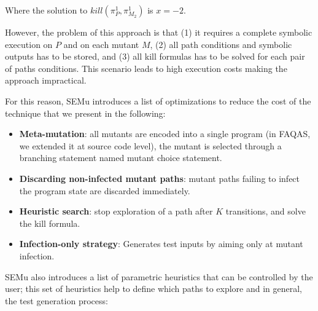Where the solution to $kill(\pi_{P}^{1}, \pi_{M_2}^{1})$ is $x = -2$.

However, the problem of this approach is that (1) it requires a complete symbolic execution on $P$ and on each mutant $M$, (2) all path conditions and symbolic outputs has to be stored, and (3) all kill formulas has to be solved for each pair of paths conditions. This scenario leads to high execution costs making the approach impractical.

For this reason, SEMu introduces a list of optimizations to reduce the cost of the technique that we present in the following:

\begin{itemize}
	\item \textbf{Meta-mutation}: all mutants are encoded into a single program (in FAQAS, we extended it at source code level), the mutant is selected through a branching statement named mutant choice statement.
	\item \textbf{Discarding non-infected mutant paths}: mutant paths failing to infect the program state are discarded immediately.
	\item \textbf{Heuristic search}: stop exploration of a path after $K$ transitions, and solve the kill formula.
	\item \textbf{Infection-only strategy}: Generates test inputs by aiming only at mutant infection.
\end{itemize}

SEMu also introduces a list of parametric heuristics that can be controlled by the user; this set of heuristics help to define which paths to explore and in general, the test generation process:

